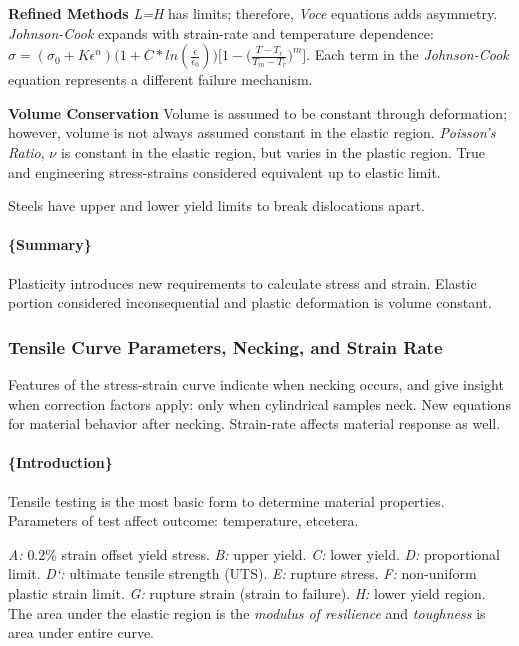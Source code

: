 \documentclass[
]{article}
\begin{document}
\textbf{Refined Methods} \textit{L=H} has limits; therefore,
\textit{Voce} equations adds asymmetry. \textit{Johnson-Cook} expands
with strain-rate and temperature dependence:
\(\sigma = (\sigma_{0} + K\epsilon^{n})\bigl(1 + C*ln(\frac{\dot{\epsilon}}{\dot{\epsilon_{0}}})\bigr)\bigl[1 - \bigl(\frac{T - T_{r}}{T_{m} - T_{r}}\bigr)^{m}\bigr]\).
Each term in the \textit{Johnson-Cook} equation represents a different
failure mechanism.

\textbf{Volume Conservation} Volume is assumed to be constant through
deformation; however, volume is not always assumed constant in the
elastic region. \textit{Poisson's Ratio}, \(\nu\) is constant in the
elastic region, but varies in the plastic region. True and engineering
stress-strains considered equivalent up to elastic limit.

{Steels have upper and lower yield limits to break dislocations apart.}

\hypertarget{summary-3}{%
\paragraph{\{Summary\}}\label{summary-3}}

Plasticity introduces new requirements to calculate stress and strain.
Elastic portion considered inconsequential and plastic deformation is
volume constant.

\hypertarget{tensile-curve-parameters-necking-and-strain-rate}{%
\subsubsection{Tensile Curve Parameters, Necking, and Strain
Rate}\label{tensile-curve-parameters-necking-and-strain-rate}}

Features of the stress-strain curve indicate when necking occurs, and
give insight when correction factors apply: only when cylindrical
samples neck. New equations for material behavior after necking.
Strain-rate affects material response as well.

\hypertarget{introduction-5}{%
\paragraph{\{Introduction\}}\label{introduction-5}}

Tensile testing is the most basic form to determine material properties.
Parameters of test affect outcome: temperature, etcetera.

{\textit{A:} \(0.2\%\) strain offset yield stress. \textit{B:} upper
yield. \textit{C:} lower yield. \textit{D:} proportional limit.
\textit{D`:} ultimate tensile strength (UTS). \textit{E:} rupture
stress. \textit{F:} non-uniform plastic strain limit. \textit{G:}
rupture strain (strain to failure). \textit{H:} lower yield region. The
area under the elastic region is the \textit{modulus of resilience} and
\textit{toughness} is area under entire curve.}
\end{document}
